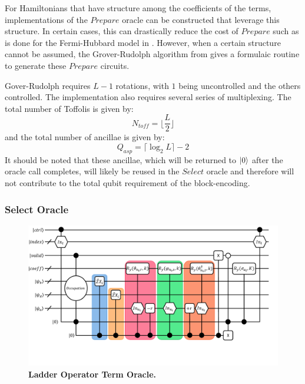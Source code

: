 For Hamiltonians that have structure among the coefficients of the terms, implementations of the $\textit{Prepare}$ oracle can be constructed that leverage this structure.
In certain cases, this can drastically reduce the cost of $\textit{Prepare}$ such as is done for the Fermi-Hubbard model in \cite{babbush2018encoding}.
However, when a certain structure cannot be assumed, the Grover-Rudolph algorithm from \cite{grover2002creating} gives a formulaic routine to generate these $\textit{Prepare}$ circuits.

Gover-Rudolph requires $L-1$ rotations, with $1$ being uncontrolled and the others controlled.
The implementation also requires several series of multiplexing.
The total number of Toffolis  is given by:
\begin{equation}
    N_{\textit{toff}} = \lfloor \frac{L}{2} \rfloor
\end{equation}
and the total number of ancillae is given by:
\begin{equation}
    Q_{asp} = \lceil \log_2{L} \rceil - 2
\end{equation}
It should be noted that these ancillae, which will be returned to $\ket{0}$ after the oracle call completes, will likely be reused in the $\textit{Select}$ oracle and therefore will not contribute to the total qubit requirement of the block-encoding.

\subsubsection{Select Oracle}
\label{subsubsec:select}

\begin{figure}
    \centering
    \includegraphics[width=16cm]{figures/applying-term.pdf}
    \caption{\textbf{Ladder Operator Term Oracle.}
    }
    \label{fig:lobe-term}
\end{figure}


